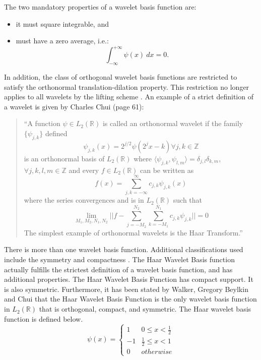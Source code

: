 The two mandatory properties of a wavelet basis function are:
\begin{itemize}
\item it must square integrable,   and
\item must have a zero average, i.e.:
\[
\int_{-\infty}^{+\infty}\psi(x) \ dx = 0.
\]
\end{itemize}
In addition, the class of orthogonal wavelet basis functions are restricted to satisfy
the orthonormal translation-dilation property. This restriction no longer applies to all wavelets by the lifting scheme %
\cite{fernandez96software}. An example
of a strict definition of a wavelet is given by Charles Chui \cite{ChuiIntro} (page 61):  
\begin{quote}
``A function $\psi \in L_2({\mathbb R})$ is called an orthonormal wavelet if the family $\{\psi_{j,k}\}$ defined 
\[ \psi_{j,k}(x)  = 2^{j/2} \psi (2 ^j x -k) \forall j,k \in {\mathbb Z} \]
is an orthonormal basis of $L_2({\mathbb R})$ where $\langle \psi _{j,k} , \psi_{l,m} \rangle = \delta _{j,l} \delta_{k,m}$,  $ \forall j,k,l,m\in {\mathbb Z}$ and every $ f\in L_2({\mathbb R})$ can be written as 
\[ f(x)= \sum\limits _{j,k = -\infty}^{\infty} c_{j,k} \psi _{j,k} (x)  \]
where the series convergences and is %
in $L_2({\mathbb R})$ such that 
\[ \lim\limits _{M_1, M_2, N_1 , N_2} || f - \sum\limits _{j=-M_2}^{N_2} \sum\limits _{k=-M_1}^{N_1} c_{j,k} \psi _{j,k} || = 0 \]
The simplest example of orthonormal wavelets is the Haar Transform.''
\end{quote}

There is more than one wavelet basis function. Additional classifications used include the symmetry and compactness \cite{jawerth94overview}. The Haar Wavelet Basis function actually fulfills the strictest definition of a wavelet basis function, and has additional properties.  The Haar Wavelet Basis Function has compact support.  It is also symmetric.  Furthermore, it has been stated by Walker\cite{walker}, Gregory Beylkin \cite{amsbeylkin,bvpbeylkin,fwtnal} and Chui \cite{ChuiIntro} that the Haar Wavelet Basis Function is the only wavelet basis function in $L_2({\mathbb R})$ that is orthogonal, compact, and symmetric.  The Haar wavelet basis function is defined below.
\begin{equation} \label{eqn:waveletbasis}
\psi(x) = \left\{
\begin{array}{cc}
1 & 0\le x < \frac{1}{2} \\
-1 & \frac{1}{2} \le x < 1 \\
0 & {otherwise}
\end{array}\right. 
\end{equation}


